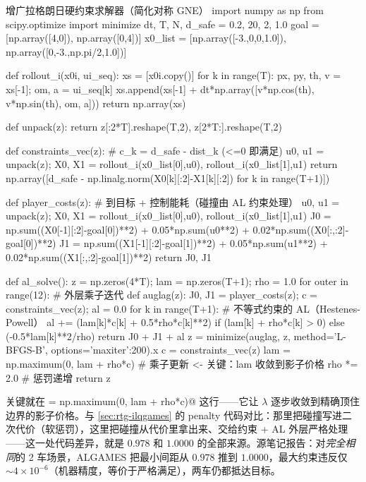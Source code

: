 \begin{codebox}[Python]{增广拉格朗日硬约束求解器（简化对称 GNE）}
import numpy as np
from scipy.optimize import minimize
dt, T, N, d_safe = 0.2, 20, 2, 1.0
goal = [np.array([4,0]), np.array([0,4])]
x0_list = [np.array([-3.,0,0,1.0]), np.array([0,-3.,np.pi/2,1.0])]

def rollout_i(x0i, ui_seq):
    xs = [x0i.copy()]
    for k in range(T):
        px, py, th, v = xs[-1]; om, a = ui_seq[k]
        xs.append(xs[-1] + dt*np.array([v*np.cos(th), v*np.sin(th), om, a]))
    return np.array(xs)

def unpack(z): return z[:2*T].reshape(T,2), z[2*T:].reshape(T,2)

def constraints_vec(z):                              # c_k = d_safe - dist_k (<=0 即满足)
    u0, u1 = unpack(z); X0, X1 = rollout_i(x0_list[0],u0), rollout_i(x0_list[1],u1)
    return np.array([d_safe - np.linalg.norm(X0[k][:2]-X1[k][:2]) for k in range(T+1)])

def player_costs(z):                                 # 到目标 + 控制能耗（碰撞由 AL 约束处理）
    u0, u1 = unpack(z); X0, X1 = rollout_i(x0_list[0],u0), rollout_i(x0_list[1],u1)
    J0 = np.sum((X0[-1][:2]-goal[0])**2) + 0.05*np.sum(u0**2) + 0.02*np.sum((X0[:,:2]-goal[0])**2)
    J1 = np.sum((X1[-1][:2]-goal[1])**2) + 0.05*np.sum(u1**2) + 0.02*np.sum((X1[:,:2]-goal[1])**2)
    return J0, J1

def al_solve():
    z = np.zeros(4*T); lam = np.zeros(T+1); rho = 1.0
    for outer in range(12):                          # 外层乘子迭代
        def auglag(z):
            J0, J1 = player_costs(z); c = constraints_vec(z); al = 0.0
            for k in range(T+1):                     # 不等式约束的 AL（Hestenes-Powell）
                al += (lam[k]*c[k] + 0.5*rho*c[k]**2) if (lam[k] + rho*c[k] > 0) else (-0.5*lam[k]**2/rho)
            return J0 + J1 + al
        z = minimize(auglag, z, method='L-BFGS-B', options={'maxiter':200}).x
        c = constraints_vec(z)
        lam = np.maximum(0, lam + rho*c)             # 乘子更新 <- 关键：lam 收敛到影子价格
        rho *= 2.0                                    # 惩罚递增
    return z
\end{codebox}

\noindent 关键就在 \verb@lam = np.maximum(0, lam + rho*c)@ 这行——它让 $\lambda$ 逐步收敛到精确顶住边界的影子价格。与 \cref{sec:rtg-ilqgames} 的 penalty 代码对比：那里把碰撞写进二次代价（软惩罚），这里把碰撞从代价里拿出来、交给约束 + AL 外层严格处理——这一处代码差异，就是 $0.978$ 和 $1.0000$ 的全部来源。源笔记报告：对\emph{完全相同}的 2 车场景，ALGAMES 把最小间距从 $0.978$ 推到 $1.0000$，最大约束违反仅 $\sim4\times10^{-6}$（机器精度，等价于严格满足），两车仍都抵达目标\cite{lecleach2022algames}。

